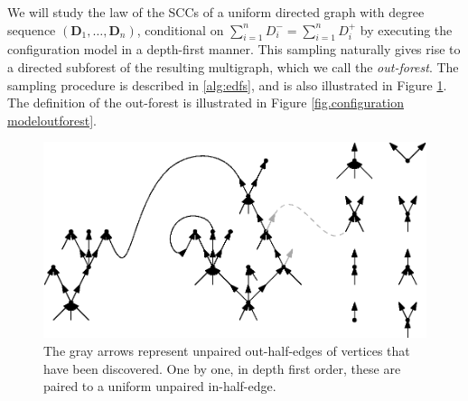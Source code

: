 We will study the law of the SCCs of a uniform directed graph with degree sequence $(\mathbf{D}_1,\dots,\mathbf{D}_n)$, conditional on $\sum_{i=1}^n D^-_i=\sum_{i=1}^n D^+_i$ by executing the configuration model in a depth-first manner. This sampling naturally gives rise to a directed subforest of the resulting multigraph, which we call the \emph{out-forest}. The sampling procedure is  described in \cref{alg:edfs}, and is also illustrated in Figure \ref{fig.configuration model}. The definition of the out-forest is illustrated in Figure \ref{fig.configuration modeloutforest}.  

\begin{figure}
    \centering
    \includegraphics[scale=1]{Content/Pictures/configuration_model.eps}
    \caption{The gray arrows represent unpaired out-half-edges of vertices that have been discovered. One by one, in depth first order, these are paired to a uniform unpaired in-half-edge.}
    \label{fig.configuration model}
\end{figure}
